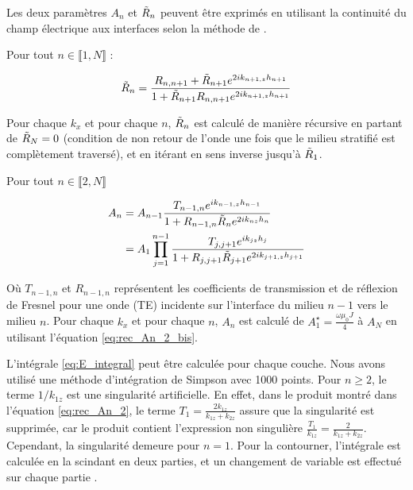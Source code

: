 Les deux paramètres $A_n$ et $\Tilde{R}_n$ peuvent être exprimés en utilisant la continuité du champ électrique aux interfaces selon la méthode de \cite{chew1999waves}.\par

Pour tout $n\in \llbracket 1,N \rrbracket$ :

\begin{equation}
\Tilde{R}_n = \frac{R_{n,n+1} + \Tilde{R}_{n+1} e^{2i k_{n+1,z} h_{n+1}}}{ 1 + \Tilde{R}_{n+1} R_{n,n+1} e^{2i k_{n+1,z} h_{n+1}}}
\label{eq:rec_Rn}
\end{equation}

Pour chaque $k_x$ et pour chaque $n$, $\Tilde{R}_n$ est calculé de manière récursive en partant de $\Tilde{R}_{N}=0$ (condition de non retour de l'onde une fois que le milieu stratifié est complètement traversé), et en itérant en sens inverse jusqu'à $\Tilde{R}_{1}$.\par

Pour tout $n\in \llbracket 2,N \rrbracket$

\begin{align}
 A_n &= A_{n-1} \frac{T_{n-1,n}e^{ik_{n-1,z} h_{n-1}}}{1+R_{n-1,n} \tR_n e^{2ik_{nz} h_n}} \label{eq:rec_An_2_bis}\\ %
 &= A_1 \prod_{j=1}^{n-1} \frac{T_{j,j+1} e^{ik_{jz}h_j}}{1+ R_{j,j+1} \Tilde{R}_{j+1}e^{2ik_{j+1,z}h_{j+1}}}
\label{eq:rec_An_2}
\end{align}
%

Où $T_{n-1,n}$ et $R_{n-1,n}$ représentent les coefficients de transmission et de réflexion de Fresnel pour une onde (TE) incidente sur l'interface du milieu $n-1$ vers le milieu $n$. Pour chaque $k_x$ et pour chaque $n$, $A_n$ est calculé de $A^\star_1 =\frac{\omega \mu_0 J}{4}$ à $A_N$ en utilisant l'équation \eqref{eq:rec_An_2_bis}.\par

L'intégrale \eqref{eq:E_integral} peut être calculée pour chaque couche. Nous avons utilisé une méthode d'intégration de Simpson avec 1000 points. Pour $n \ge 2$, le terme $1/k_{1z}$ est une singularité artificielle. En effet, dans le produit montré dans l'équation \eqref{eq:rec_An_2}, le terme $T_1 = \frac{2k_{1z}}{k_{1z}+k_{2z}}$ assure que la singularité est supprimée, car le produit contient l'expression non singulière $\frac{T_1}{k_{1z}} = \frac{2}{k_{1z}+k_{2z}}$. Cependant, la singularité demeure pour $n=1$. Pour la contourner, l'intégrale est calculée en la scindant en deux parties, et un changement de variable est effectué sur chaque partie \cite{Gille_Micolau}.